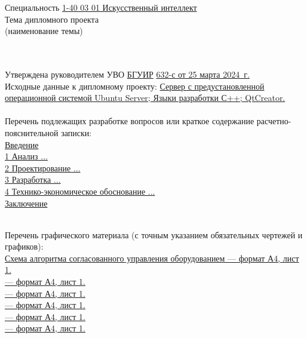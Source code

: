 {\begin{center}
  Специальность \uline{1-40 03 01 Искусственный интеллект}\lineunderscore\\[0.5em]

  Тема дипломного проекта \uline{\topicName}\lineunderscore \\
  {\footnotesize\hspace{15em}(наименование темы)}\\[-0.5em]
  \lineunderscore\\[0.5em]\lineunderscore\\
  \end{center}

  Утверждена руководителем УВО \uline{БГУИР} \textnumero  \uline{632-с от 25 марта 2024~г.}\lineunderscore\\[-0.5em]

  Исходные данные к дипломному проекту: \uline{Сервер с предустановленной операционной системой Ubuntu Server; Языки разработки С++; QtCreator.}\lineunderscore\\[0.5em]
  \lineunderscore\\

  Перечень подлежащих разработке вопросов или краткое содержание расчетно-пояснительной записки:
  \lineunderscore\\
  \uline{Введение}\lineunderscore\\
  \uline{1 Анализ ...}\lineunderscore\\
  \uline{2 Проектирование ...}\lineunderscore\\
  \uline{3 Разработка ...}\lineunderscore\\
  \uline{4 Технико-экономическое обоснование ...}\lineunderscore\\
  \uline{Заключение}\lineunderscore\\
  \lineunderscore\\
  \clearpage
  \thispagestyle{empty}

  Перечень графического материала (с точным указанием обязательных чертежей и графиков):
  \lineunderscore\\
  \uline{Схема алгоритма согласованного управления оборудованием --- формат А4, лист 1. }\lineunderscore\\
  \uline{ --- формат А4, лист 1. }\lineunderscore\\
  \uline{ --- формат А4, лист 1. }\lineunderscore\\
  \uline{ --- формат А4, лист 1. }\lineunderscore\\
  \uline{ --- формат А4, лист 1. }\lineunderscore\\
  \uline{ --- формат А4, лист 1. }\lineunderscore\\
  \lineunderscore\\

}
